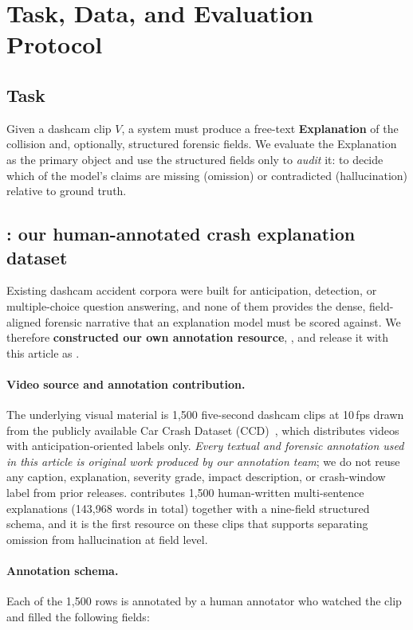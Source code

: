 \section{Task, Data, and Evaluation Protocol}
\label{sec:dataset}

\subsection{Task}
Given a dashcam clip $V$, a system must produce a free-text \textbf{Explanation} of the collision and, optionally, structured forensic fields.
We evaluate the Explanation as the primary object and use the structured fields only to \emph{audit} it: to decide which of the model's claims are missing (omission) or contradicted (hallucination) relative to ground truth.

\subsection{\dataset{}: our human-annotated crash explanation dataset}
\label{sec:ourdata}

Existing dashcam accident corpora were built for anticipation, detection, or multiple-choice question answering, and none of them provides the dense, field-aligned forensic narrative that an explanation model must be scored against.
We therefore \textbf{constructed our own annotation resource}, \dataset{}, and release it with this article as
.

\paragraph{Video source and annotation contribution.}
The underlying visual material is 1{,}500 five-second dashcam clips at 10\,fps drawn from the publicly available Car Crash Dataset (CCD)~\cite{bao2020nondeterministic}, which distributes videos with anticipation-oriented labels only.
\emph{Every textual and forensic annotation used in this article is original work produced by our annotation team}; we do not reuse any caption, explanation, severity grade, impact description, or crash-window label from prior releases.
\dataset{} contributes 1{,}500 human-written multi-sentence explanations (143{,}968 words in total) together with a nine-field structured schema, and it is the first resource on these clips that supports separating omission from hallucination at field level.

\paragraph{Annotation schema.}
Each of the 1{,}500 rows is annotated by a human annotator who watched the clip and filled the following fields:

